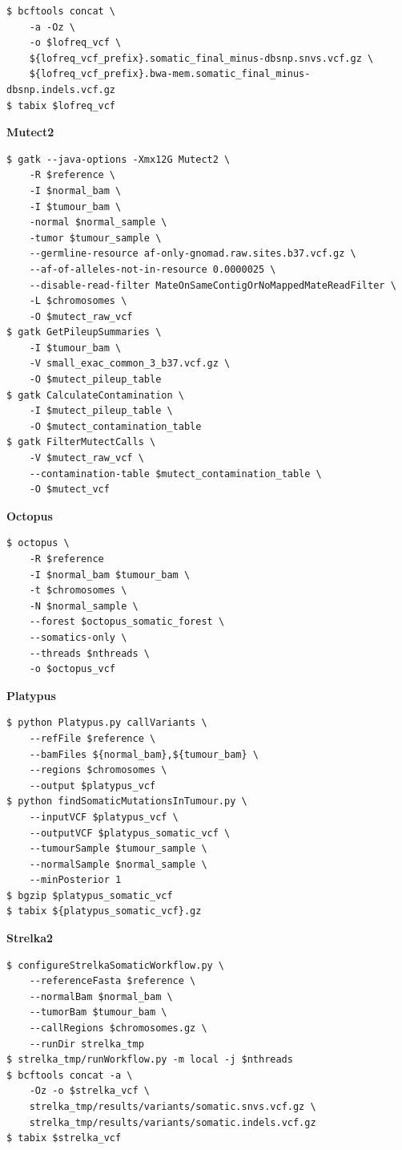 \documentclass{article}
\begin{document}
\begin{lstlisting}
$ bcftools concat \
    -a -Oz \
    -o $lofreq_vcf \
    ${lofreq_vcf_prefix}.somatic_final_minus-dbsnp.snvs.vcf.gz \
    ${lofreq_vcf_prefix}.bwa-mem.somatic_final_minus-dbsnp.indels.vcf.gz
$ tabix $lofreq_vcf
\end{lstlisting}

\noindent \textbf{Mutect2}

\begin{lstlisting}
$ gatk --java-options -Xmx12G Mutect2 \
    -R $reference \
    -I $normal_bam \
    -I $tumour_bam \
    -normal $normal_sample \
    -tumor $tumour_sample \
    --germline-resource af-only-gnomad.raw.sites.b37.vcf.gz \
    --af-of-alleles-not-in-resource 0.0000025 \
    --disable-read-filter MateOnSameContigOrNoMappedMateReadFilter \
    -L $chromosomes \
    -O $mutect_raw_vcf
$ gatk GetPileupSummaries \
    -I $tumour_bam \
    -V small_exac_common_3_b37.vcf.gz \
    -O $mutect_pileup_table
$ gatk CalculateContamination \
    -I $mutect_pileup_table \
    -O $mutect_contamination_table
$ gatk FilterMutectCalls \
    -V $mutect_raw_vcf \
    --contamination-table $mutect_contamination_table \
    -O $mutect_vcf
\end{lstlisting}

\noindent \textbf{Octopus}

\begin{lstlisting}
$ octopus \
    -R $reference
    -I $normal_bam $tumour_bam \
    -t $chromosomes \
    -N $normal_sample \
    --forest $octopus_somatic_forest \
    --somatics-only \
    --threads $nthreads \
    -o $octopus_vcf
\end{lstlisting}

\noindent \textbf{Platypus}

\begin{lstlisting}
$ python Platypus.py callVariants \
    --refFile $reference \
    --bamFiles ${normal_bam},${tumour_bam} \
    --regions $chromosomes \
    --output $platypus_vcf
$ python findSomaticMutationsInTumour.py \
    --inputVCF $platypus_vcf \
    --outputVCF $platypus_somatic_vcf \
    --tumourSample $tumour_sample \
    --normalSample $normal_sample \
    --minPosterior 1
$ bgzip $platypus_somatic_vcf
$ tabix ${platypus_somatic_vcf}.gz
\end{lstlisting}

\noindent \textbf{Strelka2}

\begin{lstlisting}
$ configureStrelkaSomaticWorkflow.py \
    --referenceFasta $reference \
    --normalBam $normal_bam \
    --tumorBam $tumour_bam \
    --callRegions $chromosomes.gz \
    --runDir strelka_tmp
$ strelka_tmp/runWorkflow.py -m local -j $nthreads
$ bcftools concat -a \
    -Oz -o $strelka_vcf \
    strelka_tmp/results/variants/somatic.snvs.vcf.gz \
    strelka_tmp/results/variants/somatic.indels.vcf.gz
$ tabix $strelka_vcf
\end{lstlisting}
\end{document}
